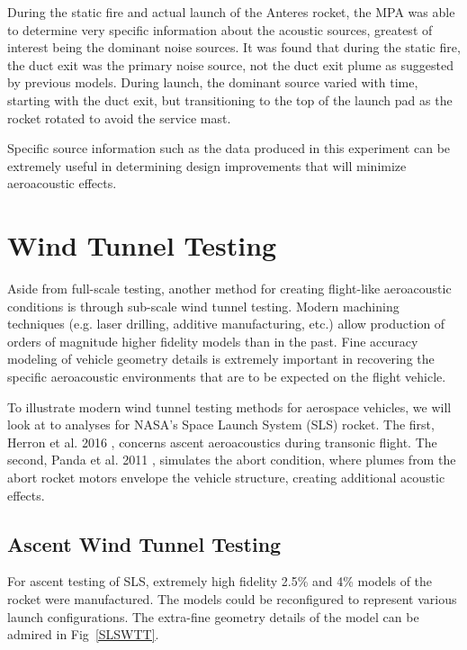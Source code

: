 \documentclass[]{aiaa-tc}%
\begin{document}
During the static fire and actual launch of the Anteres rocket, the MPA was able to determine very specific information about the acoustic sources, greatest of interest being the dominant noise sources.  It was found that during the static fire, the duct exit was the primary noise source, not the duct exit plume as suggested by previous models.  During launch, the dominant source varied with time, starting with the duct exit, but transitioning to the top of the launch pad as the rocket rotated to avoid the service mast.

Specific source information such as the data produced in this experiment can be extremely useful in determining design improvements that will minimize aeroacoustic effects.





\section{Wind Tunnel Testing}

Aside from full-scale testing, another method for creating flight-like aeroacoustic conditions is through sub-scale wind tunnel testing.  Modern machining techniques (e.g. laser drilling, additive manufacturing, etc.)\cite{SLSAscentWTT} allow production of orders of magnitude higher fidelity models than in the past.  Fine accuracy modeling of vehicle geometry details is extremely important in recovering the specific aeroacoustic environments that are to be expected on the flight vehicle.

To illustrate modern wind tunnel testing methods for aerospace vehicles, we will look at to analyses for NASA's Space Launch System (SLS) rocket.  The first, Herron et al. 2016 \cite{SLSAscentWTT}, concerns ascent aeroacoustics during transonic flight.  The second, Panda et al. 2011 \cite{HeatedHeliumWTT}, simulates the abort condition, where plumes from the abort rocket motors envelope the vehicle structure, creating additional acoustic effects.

\subsection{Ascent Wind Tunnel Testing}

For ascent testing of SLS, extremely high fidelity 2.5\% and 4\% models of the rocket were manufactured.  The models could be reconfigured to represent various launch configurations.  The extra-fine geometry details of the model can be admired in Fig~\ref{SLSWTT}.
\end{document}
